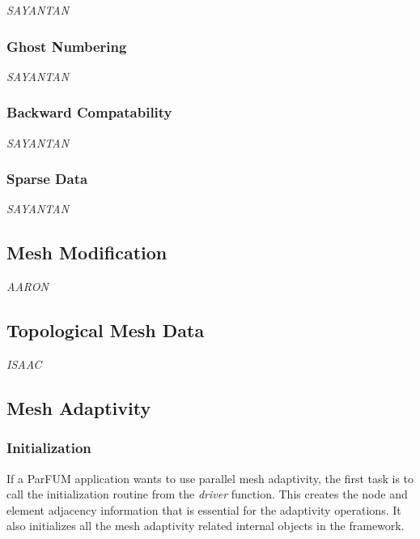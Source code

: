{\it SAYANTAN}

\subsubsection{Ghost Numbering}

{\it SAYANTAN}

\subsubsection{Backward Compatability}

{\it SAYANTAN}

\subsubsection{Sparse Data}

{\it SAYANTAN}

\subsection{Mesh Modification}

{\it AARON}

\subsection{Topological Mesh Data}

{\it ISAAC}

\subsection{Mesh Adaptivity}


\subsubsection{Initialization}
If a ParFUM application wants to use parallel mesh adaptivity,
the first task is to call the initialization routine from the 
{\it driver} function. This creates the node and element 
adjacency information that is essential for the adaptivity 
operations. It also initializes all the mesh adaptivity related
internal objects in the framework.


